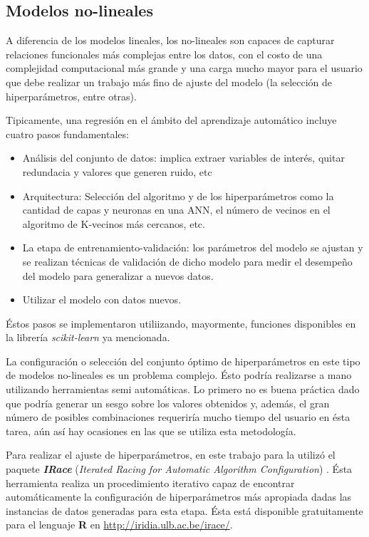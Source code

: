   \subsection{Modelos no-lineales}

    \par A diferencia de los modelos lineales, los no-lineales son capaces de
      capturar relaciones funcionales más complejas entre los datos, con el costo
      de una complejidad computacional más grande y una carga mucho mayor para el
      usuario que debe realizar un trabajo más fino de ajuste del modelo (la
      selección de hiperparámetros, entre otras).

    \par Tipicamente, una regresión en el ámbito del aprendizaje automático
      incluye cuatro pasos fundamentales:
      \begin{itemize}
        \item Análisis del conjunto de datos: implica extraer variables de interés, quitar redundacia y valores que generen
              ruido, etc
        \item Arquitectura: Selección del algoritmo y de los hiperparámetros como
              la cantidad de capas y neuronas en una ANN, el número de vecinos en
              el algoritmo de K-vecinos más cercanos, etc.
        \item La etapa de entrenamiento-validación: los parámetros del modelo
              se ajustan y se realizan técnicas de validación de dicho modelo para
              medir el desempeño del modelo para generalizar a nuevos datos.
        \item Utilizar el modelo con datos nuevos.
      \end{itemize}
      Éstos pasos se implementaron utiliizando, mayormente, funciones disponibles
      en la librería \textit{scikit-learn} ya mencionada.

    \par La configuración o selección del conjunto óptimo de hiperparámetros
      en este tipo de modelos no-lineales es un problema complejo. Ésto
      podría realizarse a mano utilizando herramientas semi automáticas. Lo primero
      no es buena práctica dado que podría generar un sesgo sobre los valores
      obtenidos y, además, el gran número de posibles combinaciones requeriría
      mucho tiempo del usuario en ésta tarea, aún así hay ocasiones en las
      que se utiliza esta metodología.

    \par Para realizar el ajuste de hiperparámetros, en este trabajo para la
      utilizó el paquete \textbf{\textit{IRace}}
      (\textit{Iterated Racing for Automatic Algorithm Configuration}) \cite{irace}.
      Ésta herramienta realiza un procedimiento iterativo capaz de encontrar
      automáticamente la configuración de hiperparámetros más apropiada
      dadas las instancias de datos generadas para esta etapa.
      Ésta está disponible gratuitamente para el lenguaje \textbf{R} en
      \url{http://iridia.ulb.ac.be/irace/}.


